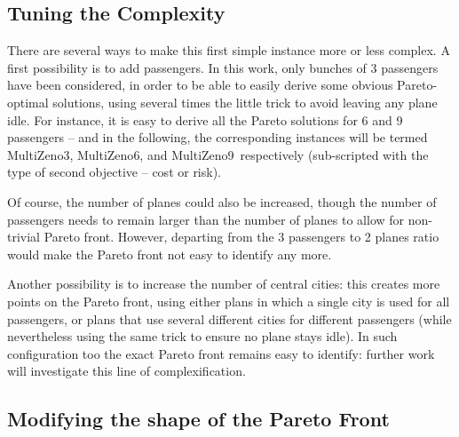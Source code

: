 \documentclass{llncs}
\def\MULTIZENO{{\sc MultiZeno}}
\begin{document}
\subsection{Tuning the Complexity}
There are several ways to make this first simple instance more or less complex. A first possibility is to  add passengers. In this work, only bunches of 3 passengers have been considered, in order to be able to easily derive some obvious Pareto-optimal solutions, using several times the little trick to avoid leaving any plane idle. For instance, it is easy to derive all the Pareto solutions for 6 and 9 passengers -- and in the following, the corresponding instances will be termed \MULTIZENO3,  \MULTIZENO6, and  \MULTIZENO9\ respectively (sub-scripted with the type of second objective -- cost or risk).

Of course, the number of planes could also be increased, though the number of passengers needs to remain larger than the number of planes to allow for non-trivial Pareto front. However, departing from the 3 passengers to 2 planes ratio would make the Pareto front not easy to identify any more.

Another possibility is to increase the number of central cities: this creates more points on the Pareto front, using either plans in which a single city is used for all passengers, or plans that use several different cities for different passengers (while nevertheless using the same trick to ensure no plane stays idle). In such configuration too the exact Pareto front remains easy to identify: further work will investigate this line of complexification.

% 
%  

\subsection{Modifying the shape of the Pareto Front}
\end{document}
